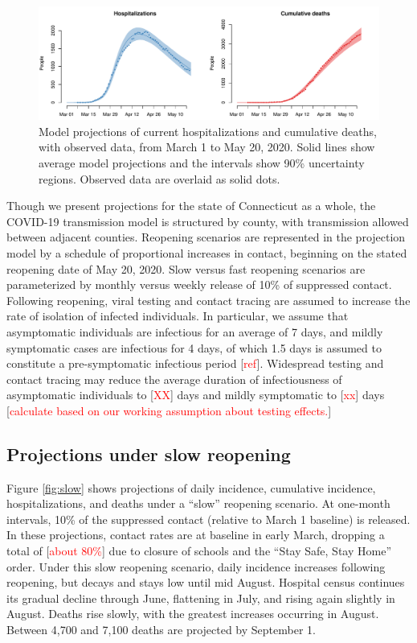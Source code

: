 \documentclass[11pt]{article}
\newcommand{\comment}[1]{[\textcolor{red}{#1}]}
\begin{document}
\begin{figure}
\centering
\includegraphics[width=\textwidth]{figures/calibration.pdf}
\caption{Model projections of current hospitalizations and cumulative deaths, with observed data, from March 1 to May 20, 2020. Solid lines show average model projections and the intervals show 90\% uncertainty regions.  Observed data are overlaid as solid dots.} 
\label{fig:calibration}
\end{figure}

Though we present projections for the state of Connecticut as a whole, the COVID-19 transmission model is structured by county, with transmission allowed between adjacent counties. Reopening scenarios are represented in the projection model by a schedule of proportional increases in contact, beginning on the stated reopening date of May 20, 2020. Slow versus fast reopening scenarios are parameterized by monthly versus weekly release of 10\% of suppressed contact.  Following reopening, viral testing and contact tracing are assumed to increase the rate of isolation of infected individuals. In particular, we assume that asymptomatic individuals are infectious for an average of 7 days, and mildly symptomatic cases are infectious for 4 days, of which 1.5 days is assumed to constitute a pre-symptomatic infectious period \comment{ref}. Widespread testing and contact tracing may reduce the average duration of infectiousness of asymptomatic individuals to \comment{XX} days and mildly symptomatic to \comment{xx} days \comment{calculate based on our working assumption about testing effects.}






\subsection*{Projections under slow reopening} 

Figure \ref{fig:slow} shows projections of daily incidence, cumulative incidence, hospitalizations, and deaths under a ``slow'' reopening scenario. At one-month intervals, 10\% of the suppressed contact (relative to March 1 baseline) is released.  In these projections, contact rates are at baseline in early March, dropping a total of \comment{about 80\%} due to closure of schools and the ``Stay Safe, Stay Home'' order.  Under this slow reopening scenario, daily incidence increases following reopening, but decays and stays low until mid August.  Hospital census continues its gradual decline through June, flattening in July, and rising again slightly in August. Deaths rise slowly, with the greatest increases occurring in August. Between 4,700 and 7,100 deaths are projected by September 1.  
\end{document}
